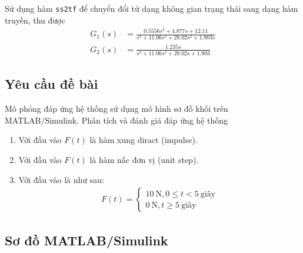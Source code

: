 \documentclass[12pt,a4paper]{article}
\begin{document}
Sử dụng hàm \texttt{ss2tf} để chuyển đổi từ dạng không gian trạng thái sang dạng hàm truyền, thu được
\begin{align}
    G_1(s) &= \frac{0.5556 s^2 + 4.877 s + 12.11}{s^4 + 11.06 s^3 + 28.02 s^2 + 1.903 s} \\
    G_2(s) &= \frac{1.235s}{s^3 + 11.06 s^2 + 28.02 s + 1.903}
\end{align}

\subsection{Yêu cầu đề bài}
Mô phỏng đáp ứng hệ thống sử dụng mô hình sơ đồ khối trên MATLAB/Simulink. Phân tích 
và đánh giá đáp ứng hệ thống
\begin{enumerate}
    \item Với đầu vào $F(t)$ là hàm xung diract (impulse).
    \item Với đầu vào $F(t)$ là hàm nấc đơn vị (unit step). 
    \item Với đầu vào là như sau:
    \begin{align}
        F(t) = \begin{cases}
        10\ \text{N}, 0 \le t < 5\ \text{giây}\\
        0\ \text{N}, t \ge 5\ \text{giây}
    \end{cases} \label{eqn:hxd}
    \end{align}
\end{enumerate}

\subsection{Sơ đồ MATLAB/Simulink}
\end{document}
